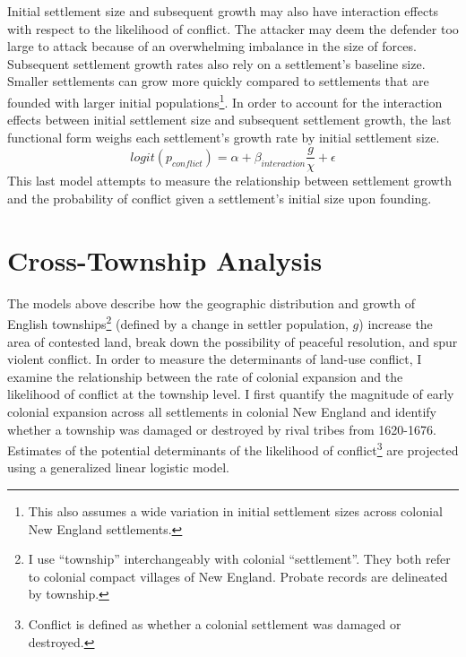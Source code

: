 \documentclass[sn-mathphys]{sn-jnl}%
\theoremstyle{thmstyleone}%
\theoremstyle{thmstyletwo}%
\theoremstyle{thmstylethree}%
\begin{document}
Initial settlement size and subsequent growth may also have interaction effects with respect to the likelihood of conflict. The attacker may deem the defender too large to attack because of an overwhelming imbalance in the size of forces. Subsequent settlement growth rates also rely on a settlement's baseline size. Smaller settlements can grow more quickly compared to settlements that are founded with larger initial populations\footnote{This also assumes a wide variation in initial settlement sizes across colonial New England settlements.}. In order to account for the interaction effects between initial settlement size and subsequent settlement growth, the last functional form weighs each settlement's growth rate by initial settlement size.
\begin{equation}
logit(p_{conflict})= \alpha + \beta_{interaction}\frac{g}{\chi} + \epsilon 
\end{equation}
This last model attempts to measure the relationship between settlement growth and the probability of conflict given a settlement's initial size upon founding.

\section{Cross-Township Analysis}\label{sec4}

The models above describe how the geographic distribution and growth of English townships\footnote{I use ``township'' interchangeably with colonial ``settlement''. They both refer to colonial compact villages of New England. Probate records are delineated by township.} (defined by a change in settler population, $g$) increase the area of contested land, break down the possibility of peaceful resolution, and spur violent conflict.
In order to measure the determinants of land-use conflict, I examine the relationship between the rate of colonial expansion and the likelihood of conflict at the township level. I first quantify the magnitude of early colonial expansion across all settlements in colonial New England and identify whether a township was damaged or destroyed by rival tribes from 1620-1676. Estimates of the potential determinants of the likelihood of conflict\footnote{Conflict is defined as whether a colonial settlement was damaged or destroyed.} are projected using a generalized linear logistic model.
\end{document}
